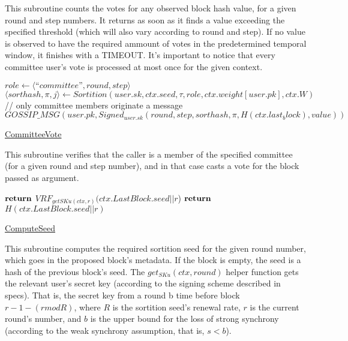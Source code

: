 \documentclass[10pt,a4paper]{article}
\begin{document}
This subroutine counts the votes for any observed block hash value, for a given round and step numbers.
It returns as soon as it finds a value exceeding the specified threshold (which will also vary according to round and step).
If no value is observed to have the required ammount of votes in the predetermined temporal window, it finishes with a TIMEOUT.
It's important to notice that every committee user's vote is processed at most once for the given context.

\begin{algorithm}
    \begin{algorithmic}[H]
    
    
    \State $role \gets ⟨“committee”,round,step⟩$
    \State $⟨sorthash,π,j⟩ \gets Sortition(user.sk,ctx.seed,τ ,role,ctx.weight[user.pk],ctx.W)$
    // only committee members originate a message
        \State $GOSSIP\_MSG(user.pk, Signed_{user.sk} (round,step,sorthash,\pi,H(ctx.last_block),value))$
    \EndIf
    
    \end{algorithmic}
    \caption{\underline{CommitteeVote}}
\end{algorithm}

This subroutine verifies that the caller is a member of the specified committee (for a given round and step number), 
and in that case casts a vote for the block passed as argument.

\begin{algorithm}
    \begin{algorithmic}[H]
            \State $\Return$ $VRF_{getSKu(ctx, r)}(ctx.LastBlock.seed||r$)
        \Else
            \State $\Return$ $H(ctx.LastBlock.seed||r)$
        \EndIf
    \end{algorithmic}
    \caption{\underline{ComputeSeed}}
\end{algorithm}

This subroutine computes the required sortition seed for the given round number, which goes in the proposed block's metadata.
If the block is empty, the seed is a hash of the previous block's seed.
The $get_{SKu}(ctx, round)$ helper function gets the relevant user's secret key (according to the signing scheme described in specs).
That is, the secret key from a round b time before block $r-1-(r mod R)$, where $R$ is the sortition seed's renewal rate, $r$ is the current round's number,
and $b$ is the upper bound for the loss of strong synchrony (according to the weak synchrony assumption, that is, $s < b$).
\end{document}
